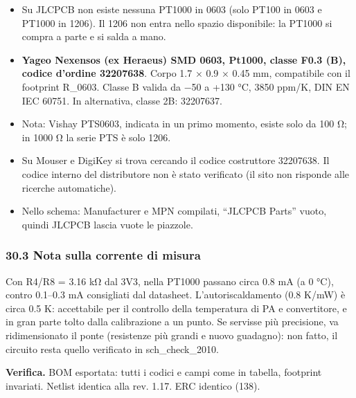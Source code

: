 \begin{itemize}
\item Su JLCPCB non esiste nessuna PT1000 in 0603 (solo PT100 in 0603 e PT1000 in 1206). Il 1206 non entra nello spazio disponibile: la PT1000 si compra a parte e si salda a mano.
\item \textbf{Yageo Nexensos (ex Heraeus) SMD 0603, Pt1000, classe F0.3 (B), codice d'ordine 32207638}. Corpo 1.7 × 0.9 × 0.45 mm, compatibile con il footprint R\_\allowbreak{}0603. Classe B valida da −50 a +130 °C, 3850 ppm/\allowbreak{}K, DIN EN IEC 60751. In alternativa, classe 2B: 32207637.
\item Nota: Vishay PTS0603, indicata in un primo momento, esiste solo da 100 Ω; in 1000 Ω la serie PTS è solo 1206.
\item Su Mouser e DigiKey si trova cercando il codice costruttore 32207638. Il codice interno del distributore non è stato verificato (il sito non risponde alle ricerche automatiche).
\item Nello schema: Manufacturer e MPN compilati, \textquotedblleft{}JLCPCB Parts\textquotedblright{} vuoto, quindi JLCPCB lascia vuote le piazzole.
\end{itemize}

\subsubsection[30.3 Nota sulla corrente di misura]{30.3 Nota sulla corrente di misura}

Con R4/\allowbreak{}R8 = 3.16 kΩ dal 3V3, nella PT1000 passano circa 0.8 mA (a 0 °C), contro 0.1–0.3 mA consigliati dal datasheet. L'autoriscaldamento (0.8 K/\allowbreak{}mW) è circa 0.5 K: accettabile per il controllo della temperatura di PA e convertitore, e in gran parte tolto dalla calibrazione a un punto. Se servisse più precisione, va ridimensionato il ponte (resistenze più grandi e nuovo guadagno): non fatto, il circuito resta quello verificato in sch\_\allowbreak{}check\_\allowbreak{}2010.

\textbf{Verifica.} BOM esportata: tutti i codici e campi come in tabella, footprint invariati. Netlist identica alla rev. 1.17. ERC identico (138).
